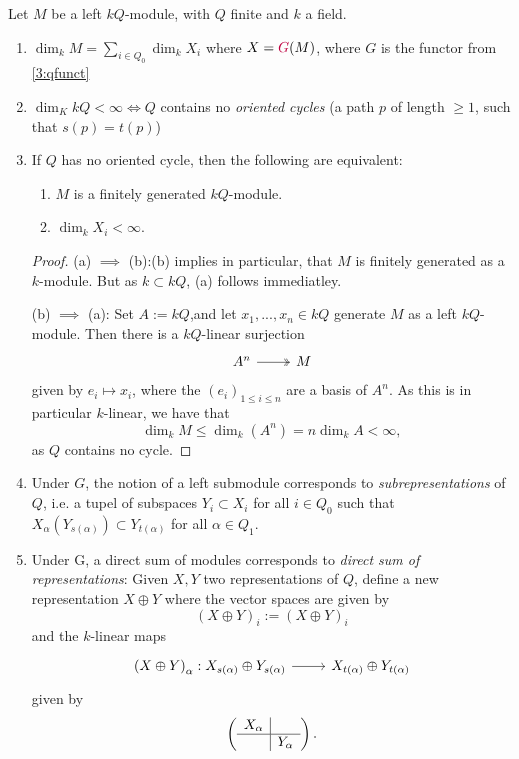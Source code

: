 \begin{rem}
  Let $M$ be a left $kQ$-module, with $Q$ finite and $k$ a field.
  \begin{enumerate}
    \item $\dim_k M = \sum_{i\in Q_0}\dim_kX_i$ where $X=\color{purple}G\color{black}(M)$,\color{purple} where $G$ is the functor from \cref{3:qfunct}\color{black}
    \item $\dim_K kQ <\infty \Longleftrightarrow Q$ contains no \emph{oriented cycles} (a path $p$ of length $\geq 1$, such that $s(p)=t(p)$)
    \item If $Q$ has no oriented cycle, then the following are equivalent:
      \begin{enumerate}[label=(\alph*)]
        \item $M$ is a finitely generated $kQ$-module.
        \item $\dim_kX_i<\infty$.
      \end{enumerate}
      \begin{proof}
        (a) $\implies$ (b):(b) implies in particular, that $M$ is finitely generated as a $k$-module. But as $k\subset kQ$, (a) follows immediatley.\par
        (b) $\implies$ (a): \coms Set $A:=kQ$,\come and let $x_1,...,x_n\in kQ$ generate $M$ as a left $kQ$-module. Then there is a $kQ$-linear surjection
        \[
        \begin{tikzcd}
          A^n\ar[\surarr]{r}&M
        \end{tikzcd}
      \] \coms given by $e_i\mapsto x_i$, where the $(e_i)_{1\leq i\leq n}$ are a basis of $A^n$. \come As this is in particular $k$-linear, we have that
      \[
      \dim_kM \leq \dim_k(A^n)=n\dim_kA< \infty,
      \]
      as $Q$ contains no cycle.
    \end{proof}
    \item Under \coms $G$\come, the notion of a \glqq left submodule\grqq{} corresponds to \emph{subrepresentations} of $Q$, i.e. a tupel of subspaces $Y_i\subset X_i$ for all $i\in Q_0$ such that $X_{\alpha}(Y_{s(\alpha)})\subset Y_{t(\alpha)}$ for all $\alpha \in Q_1$.
    \item Under \coms G\come, a direct sum of modules corresponds to \emph{direct sum of representations}: Given $X,Y$ two representations of $Q$, define a new representation $X\oplus Y$ where the vector spaces are given by
    \[ (X\oplus Y)_i:= (X\oplus Y)_i\] and the $k$-linear maps
    \[\begin{tikzcd}\left(X\oplus Y\right)_{\alpha}:X_{s(\alpha)}\oplus Y_{s(\alpha)}\ar{r} & X_{t(\alpha)}\oplus Y_{t(\alpha)}
  \end{tikzcd}
    \]
    given by
    \[
    \left(
    \begin{array}{c|c}
      X_{\alpha}&\\\hline&Y_{\alpha}
    \end{array}
    \right).
    \]
  \end{enumerate}
\end{rem}


